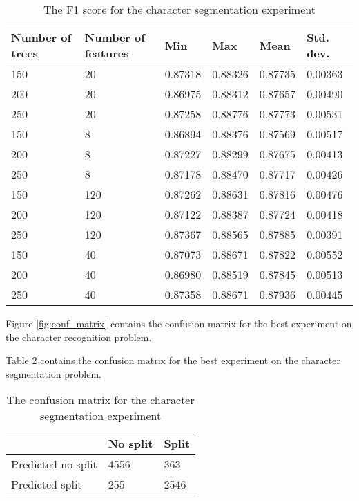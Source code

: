 \begin{table}[h]
\caption{The F1 score for the character segmentation experiment}
\label{table:seg_values}
\begin{tabular}{llllll}
\hline
Number of trees & Number of features & Min     & Max     & Mean    & Std. dev. \\ \hline
150 & 20 & 0.87318 & 0.88326 & 0.87735 & 0.00363 \\ 
200 & 20 & 0.86975 & 0.88312 & 0.87657 & 0.00490 \\ 
250 & 20 & 0.87258 & 0.88776 & 0.87773 & 0.00531 \\ 
150 & 8 & 0.86894 & 0.88376 & 0.87569 & 0.00517 \\ 
200 & 8 & 0.87227 & 0.88299 & 0.87675 & 0.00413 \\ 
250 & 8 & 0.87178 & 0.88470 & 0.87717 & 0.00426 \\ 
150 & 120 & 0.87262 & 0.88631 & 0.87816 & 0.00476 \\ 
200 & 120 & 0.87122 & 0.88387 & 0.87724 & 0.00418 \\ 
250 & 120 & 0.87367 & 0.88565 & 0.87885 & 0.00391 \\ 
150 & 40 & 0.87073 & 0.88671 & 0.87822 & 0.00552 \\ 
200 & 40 & 0.86980 & 0.88519 & 0.87845 & 0.00513 \\ 
250 & 40 & 0.87358 & 0.88671 & 0.87936 & 0.00445 \\  \hline
\end{tabular}
\end{table}

Figure \ref{fig:conf_matrix} contains the confusion matrix for the best experiment on the character recognition problem.

Table \ref{table:seg_conf} contains the confusion matrix for the best experiment on the character segmentation problem.

\begin{table}[h]
\caption{The confusion matrix for the character segmentation experiment}
\label{table:seg_conf}
\begin{tabular}{lll}
\hline
 & No split & Split \\ \hline
Predicted no split & 4556 & 363 \\ 
Predicted split & 255 & 2546 \\  \hline
\end{tabular}
\end{table}
